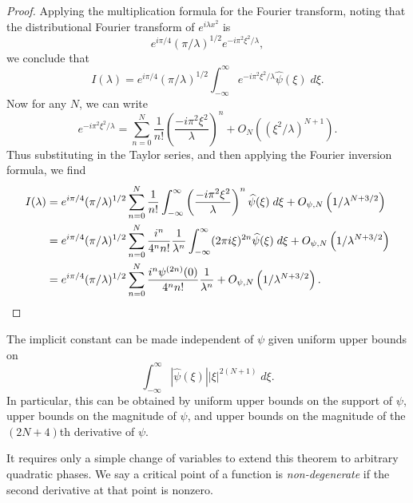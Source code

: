 \begin{proof}
  Applying the multiplication formula for the Fourier transform, noting that the distributional Fourier transform of $e^{i \lambda x^2}$ is
  \[ e^{i \pi / 4} (\pi/\lambda)^{1/2} e^{-i \pi^2 \xi^2 / \lambda}, \]
  we conclude that
  \[ I(\lambda) = e^{i \pi / 4} (\pi/\lambda)^{1/2} \int_{-\infty}^\infty e^{-i \pi^2 \xi^2 / \lambda} \widehat{\psi}(\xi)\; d\xi. \]
  Now for any $N$, we can write
  \[ e^{-i \pi^2 \xi^2 / \lambda} = \sum_{n = 0}^N \frac{1}{n!} \left( \frac{-i \pi^2 \xi^2}{\lambda} \right)^n + O_N \left( (\xi^2 / \lambda)^{N+1} \right). \]
  Thus substituting in the Taylor series, and then applying the Fourier inversion formula, we find
  \begin{align*}
    I(\lambda) &= e^{i \pi / 4} (\pi/\lambda)^{1/2} \sum_{n = 0}^N \frac{1}{n!} \int_{-\infty}^\infty \left( \frac{-i \pi^2 \xi^2}{\lambda} \right)^n \widehat{\psi}(\xi)\; d\xi + O_{\psi,N} \left( 1/\lambda^{N+3/2}  \right)\\
    &= e^{i \pi / 4} (\pi/\lambda)^{1/2} \sum_{n = 0}^N \frac{i^n}{4^n n!} \frac{1}{\lambda^n} \int_{-\infty}^\infty (2\pi i \xi)^{2n} \widehat{\psi}(\xi)\; d\xi + O_{\psi,N} \left( 1 / \lambda^{N+3/2} \right)\\
    &= e^{i \pi / 4} (\pi/\lambda)^{1/2} \sum_{n = 0}^N \frac{i^n \psi^{(2n)}(0)}{4^n n!} \frac{1}{\lambda^n} + O_{\psi,N} \left( 1 / \lambda^{N+3/2} \right). \qedhere
  \end{align*}
\end{proof}

\begin{remark}
  The implicit constant can be made independent of $\psi$ given uniform upper bounds on
  \[ \int_{-\infty}^\infty |\widehat{\psi}(\xi)| |\xi|^{2(N+1)}\; d\xi. \]
  In particular, this can be obtained by uniform upper bounds on the support of $\psi$, upper bounds on the magnitude of $\psi$, and upper bounds on the magnitude of the $(2N+4)$th derivative of $\psi$.
\end{remark}

It requires only a simple change of variables to extend this theorem to arbitrary quadratic phases. We say a critical point of a function is \emph{non-degenerate} if the second derivative at that point is nonzero.

